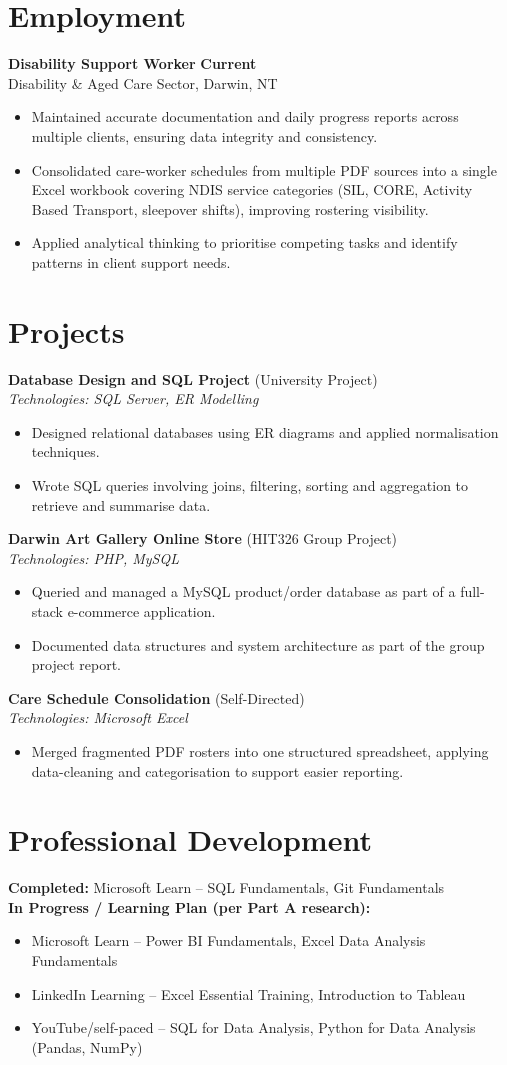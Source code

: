 \documentclass[10.5pt]{article}
\newcommand{\itemlist}[1]{\begin{itemize}[leftmargin=1.4em,itemsep=0pt,topsep=1pt,parsep=0pt]#1\end{itemize}}
\begin{document}
\section{Employment}
\textbf{Disability Support Worker} \hfill \textbf{Current} \\
Disability \& Aged Care Sector, Darwin, NT
\itemlist{
\item Maintained accurate documentation and daily progress reports across multiple clients, ensuring data integrity and consistency.
\item Consolidated care-worker schedules from multiple PDF sources into a single Excel workbook covering NDIS service categories (SIL, CORE, Activity Based Transport, sleepover shifts), improving rostering visibility.
\item Applied analytical thinking to prioritise competing tasks and identify patterns in client support needs.
}

\section{Projects}
\textbf{Database Design and SQL Project} (University Project) \\
\textit{Technologies: SQL Server, ER Modelling}
\itemlist{
\item Designed relational databases using ER diagrams and applied normalisation techniques.
\item Wrote SQL queries involving joins, filtering, sorting and aggregation to retrieve and summarise data.
}

\textbf{Darwin Art Gallery Online Store} (HIT326 Group Project) \\
\textit{Technologies: PHP, MySQL}
\itemlist{
\item Queried and managed a MySQL product/order database as part of a full-stack e-commerce application.
\item Documented data structures and system architecture as part of the group project report.
}

\textbf{Care Schedule Consolidation} (Self-Directed) \\
\textit{Technologies: Microsoft Excel}
\itemlist{
\item Merged fragmented PDF rosters into one structured spreadsheet, applying data-cleaning and categorisation to support easier reporting.
}

\section{Professional Development}
\textbf{Completed:} Microsoft Learn -- SQL Fundamentals, Git Fundamentals \\
\textbf{In Progress / Learning Plan (per Part A research):}
\itemlist{
\item Microsoft Learn -- Power BI Fundamentals, Excel Data Analysis Fundamentals
\item LinkedIn Learning -- Excel Essential Training, Introduction to Tableau
\item YouTube/self-paced -- SQL for Data Analysis, Python for Data Analysis (Pandas, NumPy)
}
\end{document}
